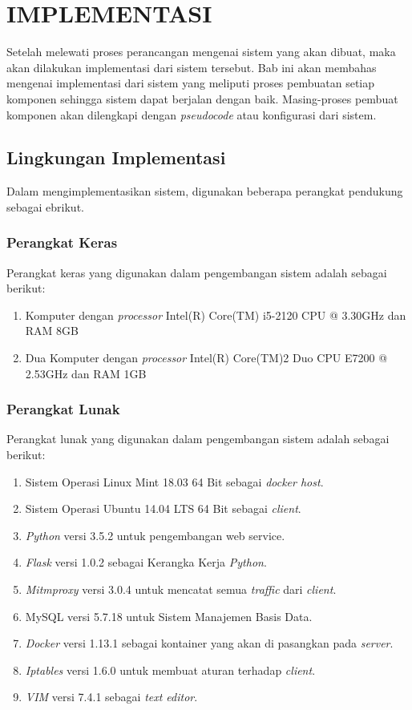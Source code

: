 \chapter{IMPLEMENTASI}
Setelah melewati proses perancangan mengenai sistem yang akan dibuat, maka akan dilakukan implementasi dari sistem tersebut. Bab ini akan membahas mengenai implementasi dari sistem yang meliputi proses pembuatan setiap komponen sehingga sistem dapat berjalan dengan baik. Masing-proses pembuat komponen akan dilengkapi dengan \textit{pseudocode} atau konfigurasi dari sistem.  
\section{Lingkungan Implementasi}
  	Dalam mengimplementasikan sistem, digunakan beberapa perangkat pendukung sebagai ebrikut.
    \subsection{Perangkat Keras}
    Perangkat keras yang digunakan dalam pengembangan sistem adalah sebagai berikut:
    \begin{enumerate}
    \item Komputer dengan \textit{processor} Intel(R) Core(TM) i5-2120 CPU @ 3.30GHz dan RAM 8GB
    \item Dua Komputer dengan \textit{processor} Intel(R) Core(TM)2 Duo CPU E7200 @ 2.53GHz dan RAM 1GB
    \end{enumerate}
    \subsection{Perangkat Lunak}
    Perangkat lunak yang digunakan dalam pengembangan sistem adalah sebagai berikut:
    \begin{enumerate}
    \item Sistem Operasi Linux Mint 18.03 64 Bit sebagai \textit{docker host}.
    \item Sistem Operasi Ubuntu 14.04 LTS 64 Bit sebagai \textit{client}.
    \item \textit{Python} versi 3.5.2 untuk pengembangan web service. 
    \item \textit{Flask} versi 1.0.2 sebagai Kerangka Kerja \textit{Python}.
    \item \textit{Mitmproxy} versi 3.0.4 untuk mencatat semua \textit{traffic} dari \textit{client}.
    \item MySQL versi 5.7.18 untuk Sistem Manajemen Basis Data.
    \item \textit{Docker} versi 1.13.1 sebagai kontainer yang akan di pasangkan pada \textit{server}.
    \item \textit{Iptables} versi 1.6.0 untuk membuat aturan terhadap \textit{client}.
    \item \textit{VIM} versi 7.4.1 sebagai \textit{text editor}.
    \end{enumerate}
  
